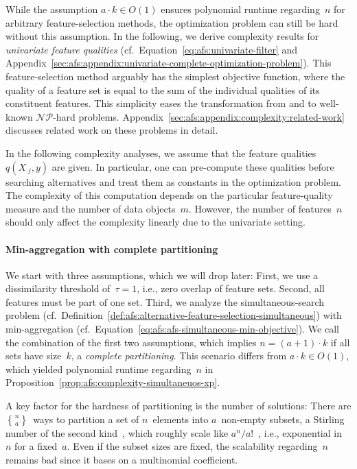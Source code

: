 \documentclass{article}
\theoremstyle{definition}
\newcommand{\stirling}[2]{\genfrac\{\}{0pt}{}{#1}{#2}} %
\begin{document}
While the assumption $a \cdot k \in O(1)$ ensures polynomial runtime regarding~$n$ for arbitrary feature-selection methods, the optimization problem can still be hard without this assumption.
In the following, we derive complexity results for \emph{univariate feature qualities} (cf.~Equation~\ref{eq:afs:univariate-filter} and Appendix~\ref{sec:afs:appendix:univariate-complete-optimization-problem}).
This feature-selection method arguably has the simplest objective function, where the quality of a feature set is equal to the sum of the individual qualities of its constituent features.
This simplicity eases the transformation from and to well-known $\mathcal{NP}$-hard problems.
Appendix~\ref{sec:afs:appendix:complexity:related-work} discusses related work on these problems in detail.

In the following complexity analyses, we assume that the feature qualities~$q(X_{\cdot{}j},y)$ are given.
In particular, one can pre-compute these qualities before searching alternatives and treat them as constants in the optimization problem.
The complexity of this computation depends on the particular feature-quality measure and the number of data objects~$m$.
However, the number of features~$n$ should only affect the complexity linearly due to the univariate setting.

\paragraph{Min-aggregation with complete partitioning}

We start with three assumptions, which we will drop later:
First, we use a dissimilarity threshold of~$\tau = 1$, i.e., zero overlap of feature sets.
Second, all features must be part of one set.
Third, we analyze the simultaneous-search problem (cf.~Definition~\ref{def:afs:alternative-feature-selection-simultaneous}) with min-aggregation (cf.~Equation~\ref{eq:afs:afs-simultaneous-min-objective}).
We call the combination of the first two assumptions, which implies $n = (a+1) \cdot k$ if all sets have size~$k$, a \emph{complete partitioning}.
This scenario differs from $a \cdot k \in O(1)$, which yielded polynomial runtime regarding~$n$ in Proposition~\ref{prop:afs:complexity-simultaneuos-xp}.

A key factor for the hardness of partitioning is the number of solutions:
There are $\stirling{n}{a}$~ways to partition a set of $n$~elements into $a$~non-empty subsets, a Stirling number of the second kind~\cite{graham1994concrete}, which roughly scale like $a^n / a!$~\cite{moser1958stirling}, i.e., exponential in~$n$ for a fixed~$a$.
Even if the subset sizes are fixed, the scalability regarding~$n$ remains bad since it bases on a multinomial coefficient.
\end{document}
